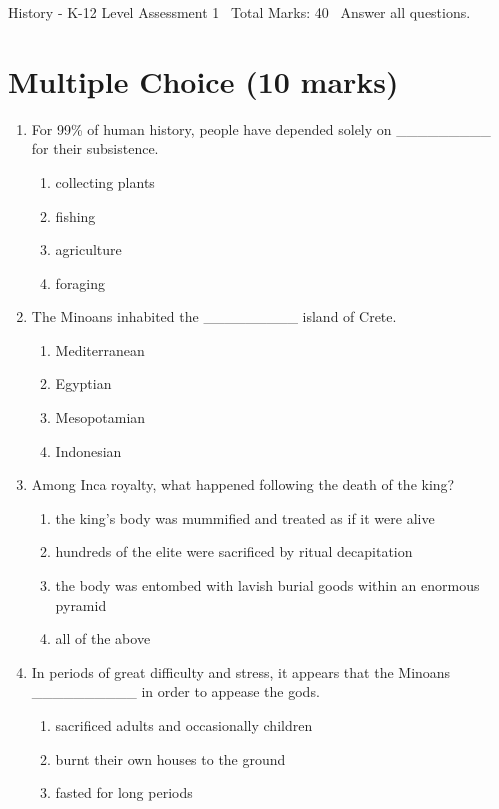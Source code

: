 \documentclass[12pt]{article}
\begin{document}
\begin{center}
History - K-12 Level Assessment 1 \
Total Marks: 40 \
Answer all questions.
\end{center}

\section*{Multiple Choice (10 marks)}
\begin{enumerate}[label=\arabic*.]
\item For 99\% of human history, people have depended solely on \_\_\_\_\_\_\_\_\_ for their subsistence.
\begin{enumerate}[label=(\alph*)]
    \item collecting plants
    \item fishing
    \item agriculture
    \item foraging
\end{enumerate}
\item The Minoans inhabited the \_\_\_\_\_\_\_\_\_ island of Crete.
\begin{enumerate}[label=(\alph*)]
    \item Mediterranean
    \item Egyptian
    \item Mesopotamian
    \item Indonesian
\end{enumerate}
\item Among Inca royalty, what happened following the death of the king?
\begin{enumerate}[label=(\alph*)]
    \item the king's body was mummified and treated as if it were alive
    \item hundreds of the elite were sacrificed by ritual decapitation
    \item the body was entombed with lavish burial goods within an enormous pyramid
    \item all of the above
\end{enumerate}
\item In periods of great difficulty and stress, it appears that the Minoans \_\_\_\_\_\_\_\_\_\_ in order to appease the gods.
\begin{enumerate}[label=(\alph*)]
    \item sacrificed adults and occasionally children
    \item burnt their own houses to the ground
    \item fasted for long periods

\end{enumerate}
\end{enumerate}
\end{document}

